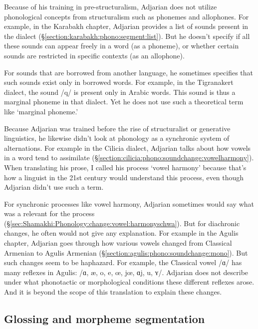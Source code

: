 Because of his training in pre-structuralism, Adjarian does not utilize phonological concepts from structuralism such as phonemes and allophones. For example, in the Karabakh chapter, Adjarian provides a list of sounds present in the dialect (\S\ref{section:karabakh:phono:segment:list}). But he doesn't specify if all these sounds can appear freely in a word (as a phoneme), or whether certain sounds are restricted in specific contexts (as an allophone). 
	
For sounds that are borrowed from another language, he sometimes specifies that such sounds exist only in borrowed words. For example, in the Tigranakert dialect, the sound /q/ is present only in Arabic words. This sound is thus a marginal phoneme in that dialect. Yet he does not use such a theoretical term like `marginal phoneme.'

Because Adjarian was trained before the rise of structuralist or generative linguistics, he likewise didn't look at  phonology as a synchronic system of alternations. For example in the Cilicia dialect, Adjarian talks about how vowels in a word tend to assimilate (\S\ref{section:cilicia:phono:soundchange:vowelharmony}). When translating his prose, I called his process `vowel harmony' because that's how a linguist in the 21st century would understand this process, even though Adjarian didn't use such a term. 

For synchronic processes like vowel harmony, Adjarian sometimes would say what was a relevant for the process (\S\ref{sec:Shamakhi:Phonology:change:vowel:harmonyschwa}). But for diachronic changes, he often would not give  any explanation. For example in the Agulis chapter, Adjarian goes through how various   vowels changed from Classical Armenian to Agulis Armenian (\S\ref{section:agulis:phono:soundchange:mono}). But such changes seem to be haphazard. For example, the  Classical vowel /ɑ/ has many reflexes in Agulis:  /ɑ, æ, o, e, œ, jœ, ɑj, u, ʏ/. Adjarian does not describe under what phonotactic or morphological conditions these different reflexes arose. And it is beyond the scope of this translation to explain these changes. 

	
 
\subsection{Glossing and morpheme segmentation}\label{sec:HossepIntro:translation:gloss}





